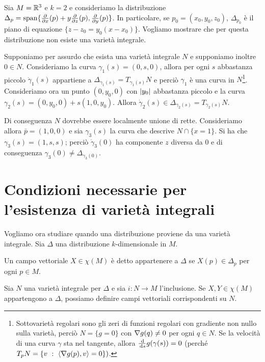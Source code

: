 \begin{example} %
	Sia $M=\mathbb R^3$ e $k=2$ e consideriamo la distribuzione $\Delta_p=\mathrm{span}\{\frac{\partial }{\partial x}(p)+y\frac{\partial }{\partial z}(p),\frac{\partial }{\partial y}(p)\}$.
	In particolare, se $p_0=(x_0,y_0,z_0)$, $\Delta_{p_0}$ è il piano di equazione $\{z-z_0=y_0(x-x_0)\}$.
	Vogliamo mostrare che per questa distribuzione non esiste una varietà integrale.
	
	Supponiamo per assurdo che esista una varietà integrale $N$ e supponiamo inoltre $0\in N$.
	Consideriamo la curva $\gamma_1(s)=(0,s,0)$, allora per ogni $s$ abbastanza piccolo $\dot\gamma_1(s)$ appartiene a $\Delta_{\gamma_1(s)}=T_{\gamma_1(s)}N$ e perciò $\gamma_1$ è una curva in $N$\footnote{Sottovarietà regolari sono gli zeri di funzioni regolari con gradiente non nullo sulla varietà, perciò $N=\{g=0\}$ con $\nabla g(q)\ne 0$ per ogni $q\in N$.
	Se la velocità di una curva $\gamma$ sta nel tangente, allora $\frac{\,\mathrm d}{\,\mathrm d s}g(\gamma(s))=0$ (perché $T_pN=\{v\ : \ \langle \nabla g(p) , v \rangle =0\})$.}. %
	Consideriamo ora un punto $(0,y_0,0)$ con $\lvert y_0\rvert$ abbastanza piccolo e la curva $\gamma_2(s)=(0,y_0,0)+s(1,0,y_0)$. Allora $\dot\gamma_2(s)\in\Delta_{\gamma_2(s)}=T_{\gamma_2(s)}N$.
	
	Di conseguenza $N$ dovrebbe essere localmente unione di rette. Consideriamo allora $\bar p=(1,0,0)$ e sia $\gamma_3(s)$ la curva che descrive $N\cap\{x=1\}$.
	Si ha che $\gamma_3(s)=(1,s,s)$; perciò $\dot\gamma_3(0)$ ha componente $z$ diversa da 0 e di conseguenza $\gamma_3(0)\ne \Delta_{\gamma_3(0)}$. %
\end{example}

\section{Condizioni necessarie per l'esistenza di varietà integrali} %

Vogliamo ora studiare quando una distribuzione proviene da una varietà integrale.
Sia $\Delta$ una distribuzione $k$-dimensionale in $M$.

\begin{definition}
	Un campo vettoriale $X\in\chi(M)$ è detto appartenere a $\Delta$ se $X(p)\in\Delta_p$ per ogni $p\in M$.
\end{definition}

Sia $N$ una varietà integrale per $\Delta$ e sia $i:N \to M$ l'inclusione.
Se $X,Y\in\chi(M)$ appartengono a $\Delta$, possiamo definire campi vettoriali corrispondenti su $N$.

